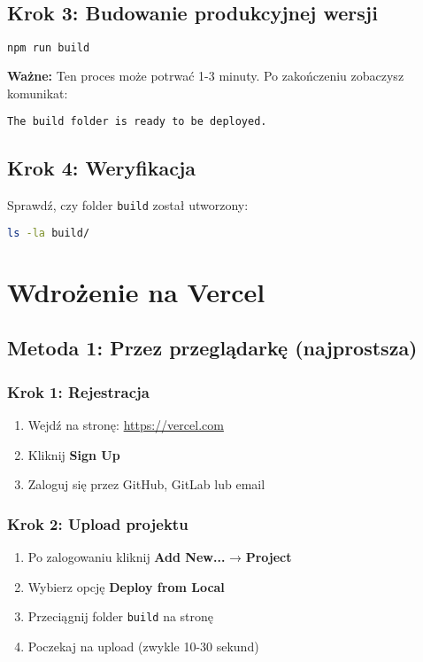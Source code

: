 \documentclass[12pt,a4paper]{article}
\begin{document}
\subsection{Krok 3: Budowanie produkcyjnej wersji}
\begin{lstlisting}[language=bash]
npm run build
\end{lstlisting}

\textbf{Ważne:} Ten proces może potrwać 1-3 minuty. Po zakończeniu zobaczysz komunikat:
\begin{verbatim}
The build folder is ready to be deployed.
\end{verbatim}

\subsection{Krok 4: Weryfikacja}
Sprawdź, czy folder \texttt{build} został utworzony:
\begin{lstlisting}[language=bash]
ls -la build/
\end{lstlisting}

\newpage
\section{Wdrożenie na Vercel}

\subsection{Metoda 1: Przez przeglądarkę (najprostsza)}

\subsubsection{Krok 1: Rejestracja}
\begin{enumerate}
    \item Wejdź na stronę: \url{https://vercel.com}
    \item Kliknij \textbf{Sign Up}
    \item Zaloguj się przez GitHub, GitLab lub email
\end{enumerate}

\subsubsection{Krok 2: Upload projektu}
\begin{enumerate}
    \item Po zalogowaniu kliknij \textbf{Add New...} → \textbf{Project}
    \item Wybierz opcję \textbf{Deploy from Local}
    \item Przeciągnij folder \texttt{build} na stronę
    \item Poczekaj na upload (zwykle 10-30 sekund)
\end{enumerate}
\end{document}
